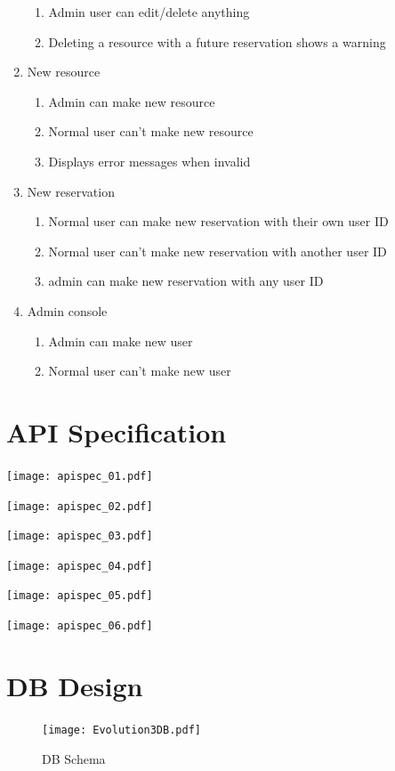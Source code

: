 \documentclass[12pt]{article}
\begin{document}
\begin{enumerate}
\begin{enumerate}
        \item Admin user can edit/delete anything
        \item Deleting a resource with a future reservation shows a warning
    \end{enumerate}
    \item New resource
    \begin{enumerate}
        \item Admin can make new resource
        \item Normal user can't make new resource
        \item Displays error messages when invalid
    \end{enumerate}
    \item New reservation
    \begin{enumerate}
        \item Normal user can make new reservation with their own user ID
        \item Normal user can't make new reservation with another user ID
        \item admin can make new reservation with any user ID
    \end{enumerate}
    \item Admin console
    \begin{enumerate}
        \item Admin can make new user
        \item Normal user can't make new user
    \end{enumerate}
\end{enumerate}

\clearpage
\section{API Specification}
\label{appendix:apispec}
\texttt{[image: apispec\_01.pdf]}

\texttt{[image: apispec\_02.pdf]}

\texttt{[image: apispec\_03.pdf]}

\texttt{[image: apispec\_04.pdf]}

\texttt{[image: apispec\_05.pdf]}

\texttt{[image: apispec\_06.pdf]}

\clearpage
\section{DB Design}
\label{appendix:DBDesign}
\begin{figure}[h]
\begin{center}
\texttt{[image: Evolution3DB.pdf]}
\end{center}
\caption{DB Schema}
\end{figure}
\end{document}
